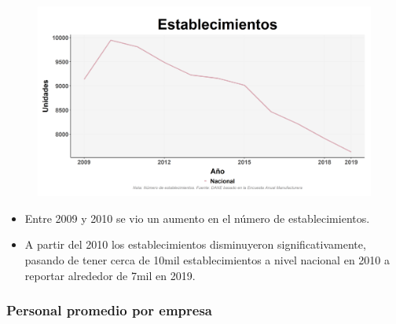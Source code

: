     \begin{figure}[H]
        \caption[Establecimientos a nivel nacional ]{\label{establecimientos_nacional} }
        \begin{center}
        \includegraphics[width=\textwidth,keepaspectratio]{img/var_218_trend.png}
        \end{center}
    \end{figure}
            \begin{itemize}
                    \item Entre 2009 y 2010 se vio un aumento en el número de establecimientos.
                    \item A partir del 2010 los establecimientos disminuyeron significativamente, pasando de tener cerca de 10mil establecimientos a nivel nacional en 2010 a reportar alrededor de 7mil en 2019.
                    \end{itemize}

        \subsubsection{Personal promedio por empresa}

